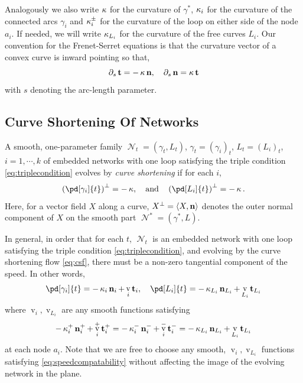\documentclass[11pt]{amsart}
\DeclareMathOperator{\tangspeed}{v}
\DeclareMathOperator{\network}{\mathcal{N}}
\begin{document}
Analogously we also write \(\operatorname{\kappa}\) for the curvature of \(\gamma^{\ast}\), \(\operatorname{\kappa}_i\) for the curvature of the connected arcs \(\gamma_i\) and \(\operatorname{\kappa}^{\pm}_i\) for the curvature of the loop on either side of the node \(a_i\). If needed, we will write \(\operatorname{\kappa}_{L_i}\) for the curvature of the free curves \(L_i\). Our convention for the Frenet-Serret equations is that the curvature vector of a convex curve is inward pointing so that,
\begin{equation}
\label{eq:frenetserret}
\partial_s \operatorname{\mathbf{t}} = -\operatorname{\kappa} \operatorname{\mathbf{n}}, \quad \partial_s \operatorname{\mathbf{n}} = \operatorname{\kappa} \operatorname{\mathbf{t}}
\end{equation}
with \(s\) denoting the arc-length parameter.

\subsection{Curve Shortening Of Networks}
\label{sec:orgheadline3}

\begin{defn}
A smooth, one-parameter family \(\network_t = (\gamma_t, L_t)\), \(\gamma_t = (\gamma_i)_t\), \(L_t = (L_i)_t\), \(i=1,\cdots,k\) of embedded networks with one loop satisfying the triple condition \eqref{eq:triplecondition} evolves by \emph{curve shortening} if for each \(i\),
\begin{equation}
\label{eq:csf}
\left(\pd[\gamma_i]{t}\right)^{\perp} = -\curvecurv, \quad \text{and} \quad \left(\pd[L_i]{t}\right)^{\perp} = -\curvecurv.
\end{equation}
Here, for a vector field \(X\) along a curve, \(X^{\perp} = \langle{X},{\operatorname{\mathbf{n}}}\rangle\) denotes the outer normal component of \(X\) on the smooth part \(\network^{\ast} = (\gamma^{\ast}, L)\).
\end{defn}

In general, in order that for each \(t\), \(\network_t\) is an embedded network with one loop satisfying the triple condition \eqref{eq:triplecondition}, and evolving by the curve shortening flow \eqref{eq:csf}, there must be a non-zero tangential component of the speed. In other words,
\begin{equation}
\label{eq:csf_with_tang}
\pd[\gamma_i]{t} = -\curvecurv_i \nor_i + \tangspeed_i \tang_i, \quad \pd[L_i]{t} = -\curvecurv_{L_i} \nor_{L_i} + \tangspeed_{L_i} \tang_{L_i}
\end{equation}
where \(\tangspeed_i, \tangspeed_{L_i}\) are any smooth functions satisfying
\begin{equation}
\label{eq:speedcompatability}
-\curvecurv_i^+ \nor_i^+ + \tangspeed_i^+ \tang_i^+ = -\curvecurv_i^- \nor_i^- + \tangspeed_i^- \tang_i^- = -\curvecurv_{L_i} \nor_{L_i} + \tangspeed_{L_i} \tang_{L_i}
\end{equation}
at each node \(a_i\). Note that we are free to choose any smooth, \(\tangspeed_i, \tangspeed_{L_i}\) functions satisfying \eqref{eq:speedcompatability} without affecting the image of the evolving network in the plane.
\end{document}
